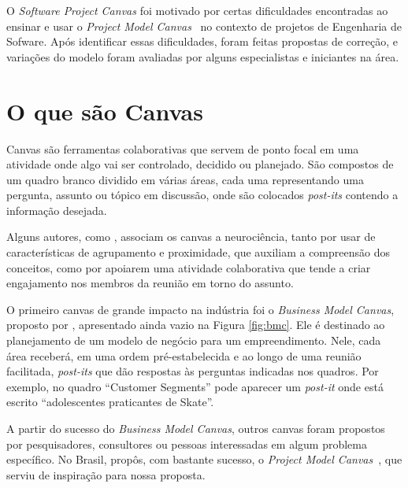 \documentclass[fontsize=12pt, a4paper,pagesize=auto,toc=listof, ,twoside,chapterprefix=false,appendixprefix=true,open=right]{scrbook}
\begin{document}
O \textit{Software Project Canvas} foi motivado por certas dificuldades encontradas ao ensinar e usar o \textit{Project Model Canvas}~\citep{finocchio:2013} no contexto de projetos de Engenharia de Sofware. Após identificar essas dificuldades, foram feitas propostas de correção, e variações do modelo foram avaliadas por alguns especialistas e iniciantes na área.


\chapter{O que são Canvas}

Canvas são ferramentas colaborativas que servem de ponto focal em uma atividade onde algo vai ser controlado, decidido ou planejado. São compostos de um quadro branco dividido em várias áreas, cada uma representando uma pergunta, assunto ou tópico em discussão, onde são colocados \textit{post-its} contendo a informação desejada.

Alguns autores, como \citet{finocchio:2013}, associam os canvas a neurociência, tanto por usar de características de agrupamento e proximidade, que auxiliam a compreensão dos conceitos, como por apoiarem uma atividade colaborativa que tende a criar engajamento nos membros da reunião em torno do assunto.

O primeiro canvas de grande impacto na indústria foi o \textit{Business Model Canvas}, proposto por \citet{osterwalder2010business}, apresentado ainda vazio na Figura \ref{fig:bmc}. Ele é destinado ao planejamento de um modelo de negócio para um empreendimento. Nele, cada área receberá, em uma ordem pré-estabelecida e ao longo de uma reunião facilitada, \textit{post-its} que dão respostas às perguntas indicadas nos quadros. Por exemplo, no quadro ``Customer Segments'' pode aparecer um \textit{post-it} onde está escrito ``adolescentes praticantes de Skate''.

A partir do sucesso do \textit{Business Model Canvas},  outros canvas foram propostos por pesquisadores, consultores ou pessoas interessadas em algum problema específico. No Brasil, \citeauthor{finocchio:2013} propôs, com bastante sucesso, o \textit{Project Model Canvas}~\citep{finocchio:2013}, que serviu de inspiração para nossa proposta.
\end{document}
